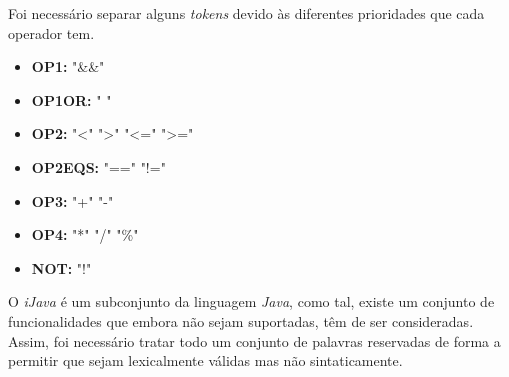 \documentclass[12pt]{article}
\begin{document}
	    Foi necessário separar alguns \emph{tokens} devido às diferentes prioridades que cada operador tem.
		\begin{itemize}  
	        \item \textbf{OP1:} "\&\&"  
	        \item \textbf{OP1OR:} "\text{\textbar} \text{\textbar}"
	        \item \textbf{OP2:} "\textless" \text{\textbar} "\textgreater" \text{\textbar} "\textless=" \text{\textbar} "\textgreater="
	        \item \textbf{OP2EQS:} "==" \text{\textbar} "!="	        
	        \item \textbf{OP3:} "+" \text{\textbar} "-"
	        \item \textbf{OP4:} "*" \text{\textbar} "/" \text{\textbar} "\%"
	        \item \textbf{NOT:} "!"
	        \end{itemize}
	         O \emph{iJava} é um subconjunto da linguagem \emph{Java}, como tal, existe um conjunto de funcionalidades que embora não sejam suportadas, têm de ser consideradas. Assim, foi necessário tratar todo um conjunto de palavras reservadas de forma a permitir que sejam lexicalmente válidas mas não sintaticamente.
\end{document}

